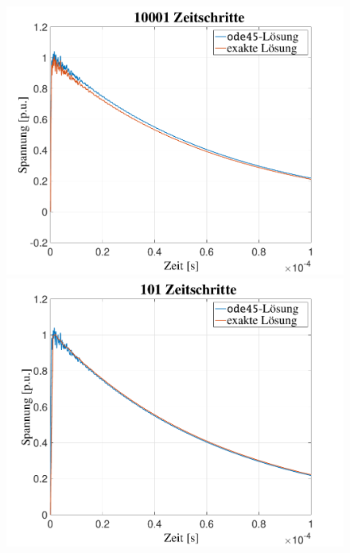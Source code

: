 \begin{refsection}
\begin{figure}
\begin{minipage}{.32\textwidth}
	    \end{minipage}
	    \begin{minipage}{.32\textwidth}
	        \centering
	        \includegraphics[width=\linewidth]{./Trafo/images/Sprung10001.pdf}
	    \end{minipage}
		\begin{minipage}{.32\textwidth}
	        \centering
	        \includegraphics[width=\linewidth]{./Trafo/images/Interp101.pdf}
	    \end{minipage}%
	    \begin{minipage}{.32\textwidth}
	        \centering

\end{minipage}
\end{figure}
\end{refsection}
